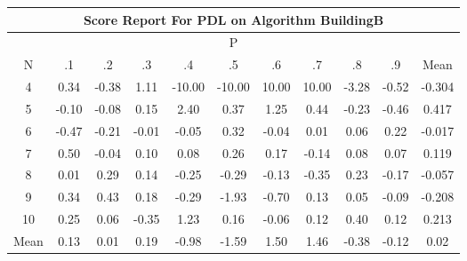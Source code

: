 \documentclass[11pt,a4paper]{report}
\begin{document}
\begin{longtable}{ | c || c | c | c | c | c | c | c | c | c || c |}
\hline
\multicolumn{11}{|c|}{ Score Report For PDL on Algorithm BuildingB} \\
\hline
\multicolumn{11}{|c|}{ P } \\
\hline
N & .1 & .2 & .3 & .4 & .5 & .6 & .7 & .8 & .9 & Mean\\
 \hline
 \hline
 \endhead
  4 &  \cellcolor[HTML]{F7F7FF} 0.34 &  \cellcolor[HTML]{FFF7F7} -0.38 &  \cellcolor[HTML]{E7E7FF} 1.11 &  \cellcolor[HTML]{FF0000} -10.00 &  \cellcolor[HTML]{FF0000} -10.00 &  \cellcolor[HTML]{0808FF} 10.00 &  \cellcolor[HTML]{0808FF} 10.00 &  \cellcolor[HTML]{FFAFAF} -3.28 &  \cellcolor[HTML]{FFEFEF} -0.52 & -0.304 \\
  5 &  \cellcolor[HTML]{FFFFFF} -0.10 &  \cellcolor[HTML]{FFFFFF} -0.08 &  \cellcolor[HTML]{FFFFFF} 0.15 &  \cellcolor[HTML]{BFBFFF} 2.40 &  \cellcolor[HTML]{F7F7FF} 0.37 &  \cellcolor[HTML]{DFDFFF} 1.25 &  \cellcolor[HTML]{F7F7FF} 0.44 &  \cellcolor[HTML]{FFF7F7} -0.23 &  \cellcolor[HTML]{FFF7F7} -0.46 & 0.417 \\
  6 &  \cellcolor[HTML]{FFF7F7} -0.47 &  \cellcolor[HTML]{FFF7F7} -0.21 &  \cellcolor[HTML]{FFFFFF} -0.01 &  \cellcolor[HTML]{FFFFFF} -0.05 &  \cellcolor[HTML]{F7F7FF} 0.32 &  \cellcolor[HTML]{FFFFFF} -0.04 &  \cellcolor[HTML]{FFFFFF} 0.01 &  \cellcolor[HTML]{FFFFFF} 0.06 &  \cellcolor[HTML]{F7F7FF} 0.22 & -0.017 \\
  7 &  \cellcolor[HTML]{EFEFFF} 0.50 &  \cellcolor[HTML]{FFFFFF} -0.04 &  \cellcolor[HTML]{FFFFFF} 0.10 &  \cellcolor[HTML]{FFFFFF} 0.08 &  \cellcolor[HTML]{F7F7FF} 0.26 &  \cellcolor[HTML]{F7F7FF} 0.17 &  \cellcolor[HTML]{FFFFFF} -0.14 &  \cellcolor[HTML]{FFFFFF} 0.08 &  \cellcolor[HTML]{FFFFFF} 0.07 & 0.119 \\
  8 &  \cellcolor[HTML]{FFFFFF} 0.01 &  \cellcolor[HTML]{F7F7FF} 0.29 &  \cellcolor[HTML]{FFFFFF} 0.14 &  \cellcolor[HTML]{FFF7F7} -0.25 &  \cellcolor[HTML]{FFF7F7} -0.29 &  \cellcolor[HTML]{FFFFFF} -0.13 &  \cellcolor[HTML]{FFF7F7} -0.35 &  \cellcolor[HTML]{F7F7FF} 0.23 &  \cellcolor[HTML]{FFF7F7} -0.17 & -0.057 \\
  9 &  \cellcolor[HTML]{F7F7FF} 0.34 &  \cellcolor[HTML]{F7F7FF} 0.43 &  \cellcolor[HTML]{F7F7FF} 0.18 &  \cellcolor[HTML]{FFF7F7} -0.29 &  \cellcolor[HTML]{FFCFCF} -1.93 &  \cellcolor[HTML]{FFEFEF} -0.70 &  \cellcolor[HTML]{FFFFFF} 0.13 &  \cellcolor[HTML]{FFFFFF} 0.05 &  \cellcolor[HTML]{FFFFFF} -0.09 & -0.208 \\
  10 &  \cellcolor[HTML]{F7F7FF} 0.25 &  \cellcolor[HTML]{FFFFFF} 0.06 &  \cellcolor[HTML]{FFF7F7} -0.35 &  \cellcolor[HTML]{DFDFFF} 1.23 &  \cellcolor[HTML]{F7F7FF} 0.16 &  \cellcolor[HTML]{FFFFFF} -0.06 &  \cellcolor[HTML]{FFFFFF} 0.12 &  \cellcolor[HTML]{F7F7FF} 0.40 &  \cellcolor[HTML]{FFFFFF} 0.12 & 0.213 \\
 \hline
 \hline
Mean &  \cellcolor[HTML]{FFFFFF} 0.13 &  \cellcolor[HTML]{FFFFFF} 0.01 &  \cellcolor[HTML]{F7F7FF} 0.19 &  \cellcolor[HTML]{FFE7E7} -0.98 &  \cellcolor[HTML]{FFD7D7} -1.59 &  \cellcolor[HTML]{D7D7FF} 1.50 &  \cellcolor[HTML]{D7D7FF} 1.46 &  \cellcolor[HTML]{FFF7F7} -0.38 &  \cellcolor[HTML]{FFFFFF} -0.12 &  \cellcolor[HTML]{FFFFFF} 0.02
\end{longtable}
\end{document}
